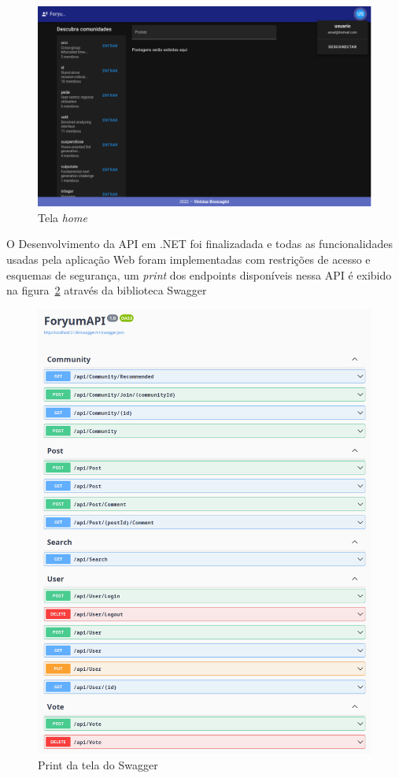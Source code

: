 \documentclass[12pt]{article}
\begin{document}
\begin{figure}[H]
    \centering
    \includegraphics[width=1\textwidth]{prints/home.png}
    \caption{Tela \textit{home}}\label{fig:home}
\end{figure}

O Desenvolvimento da API em .NET foi finalizadada e todas as funcionalidades
usadas pela aplicação Web foram implementadas com restrições de acesso e esquemas de
segurança, um \textit{print} dos endpoints disponíveis nessa API é exibido
na figura~\ref{fig:swagger} através da biblioteca Swagger

\begin{figure}[H]
    \centering
    \includegraphics[width=1\textwidth]{prints/swagger.png}
    \caption{Print da tela do Swagger}\label{fig:swagger}
\end{figure}
\end{document}
